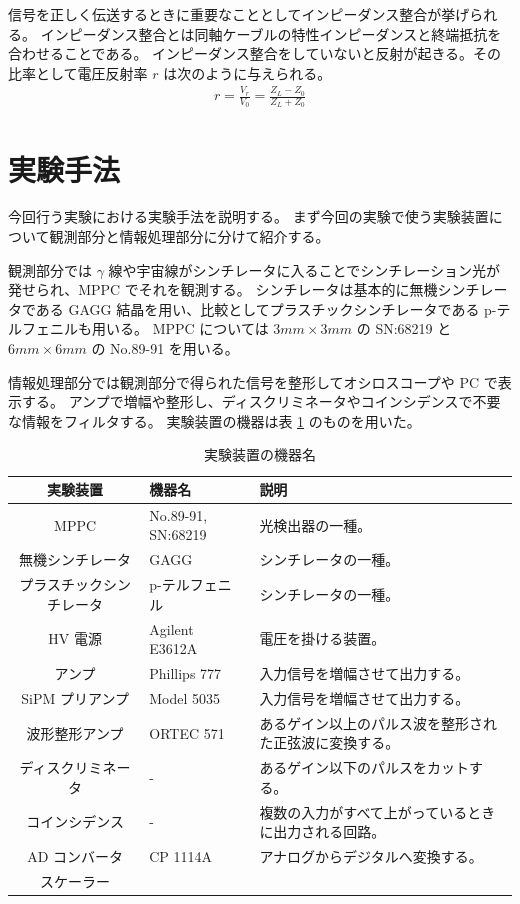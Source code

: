 \documentclass[uplatex,dvipdfmx,a4paper,11pt]{jlreq}
\numberwithin{equation}{section}
\theoremstyle{definition}
\begin{document}
信号を正しく伝送するときに重要なこととしてインピーダンス整合が挙げられる。
インピーダンス整合とは同軸ケーブルの特性インピーダンスと終端抵抗を合わせることである。
インピーダンス整合をしていないと反射が起きる。その比率として電圧反射率 $r$ は次のように与えられる。
\begin{align}
  r = \frac{V_r}{V_0} = \frac{Z_L - Z_0}{Z_L + Z_0}
\end{align}



\section{実験手法}
今回行う実験における実験手法を説明する。
まず今回の実験で使う実験装置について観測部分と情報処理部分に分けて紹介する。

観測部分では $\gamma$ 線や宇宙線がシンチレータに入ることでシンチレーション光が発せられ、MPPC でそれを観測する。
シンチレータは基本的に無機シンチレータである GAGG 結晶を用い、比較としてプラスチックシンチレータである p-テルフェニルも用いる。
MPPC については $3\si{mm}\times 3\si{mm}$ の SN:68219 と $6\si{mm}\times 6\si{mm}$ の No.89-91 を用いる。

情報処理部分では観測部分で得られた信号を整形してオシロスコープや PC で表示する。
アンプで増幅や整形し、ディスクリミネータやコインシデンスで不要な情報をフィルタする。
実験装置の機器は表 \ref{table:machine} のものを用いた。
\begin{table}
  \centering
  \begin{tabular}{|clp{7cm}|}
    \hline
    実験装置         & 機器名                & 説明                          \\
    \hline \hline
    MPPC         & No.89-91, SN:68219 & 光検出器の一種。                    \\
    無機シンチレータ     & GAGG               & シンチレータの一種。                  \\
    プラスチックシンチレータ & p-テルフェニル           & シンチレータの一種。                  \\
    HV 電源        & Agilent E3612A     & 電圧を掛ける装置。                   \\
    アンプ          & Phillips 777       & 入力信号を増幅させて出力する。             \\
    SiPM プリアンプ   & Model 5035         & 入力信号を増幅させて出力する。             \\
    波形整形アンプ      & ORTEC 571          & あるゲイン以上のパルス波を整形された正弦波に変換する。 \\
    ディスクリミネータ    & -                  & あるゲイン以下のパルスをカットする。          \\
    コインシデンス      & -                  & 複数の入力がすべて上がっているときに出力される回路。  \\
    AD コンバータ     & CP 1114A           & アナログからデジタルへ変換する。            \\
    スケーラー        &                    &                             \\
    \hline
  \end{tabular}
  \caption{実験装置の機器名}
  \label{table:machine}
\end{table}
\end{document}
